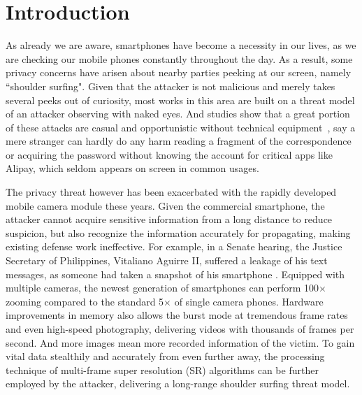 \section{Introduction}
\label{sec-introduction}

As already we are aware, smartphones have become a necessity in our lives, as we are checking our mobile phones constantly throughout the day. As a result, some privacy concerns have arisen about nearby parties peeking at our screen, namely ``shoulder surfing". 
Given that the attacker is not malicious and merely takes several peeks out of curiosity, most works in this area are built on a threat model of an attacker observing with naked eyes. And studies show that a great portion of these attacks are casual and opportunistic without technical equipment~\cite{eiband2017understanding}, say a mere stranger can hardly do any harm reading a fragment of the correspondence or acquiring the password without knowing the account for critical apps like Alipay, which seldom appears on screen in common usages. 

The privacy threat however has been exacerbated with the rapidly developed mobile camera module these years. Given the commercial smartphone, the attacker cannot acquire sensitive information from a long distance to reduce suspicion, but also recognize the information accurately for propagating, making existing defense work ineffective. For example, in a Senate hearing, the Justice Secretary of Philippines, Vitaliano Aguirre II, suffered a leakage of his text messages, as someone had taken a snapshot of his smartphone \cite{Polotiko2017leakage}. Equipped with multiple cameras, the newest generation of smartphones can perform 100$\times$ zooming compared to the standard 5$\times$ of single camera phones. Hardware improvements in memory also allows the burst mode at tremendous frame rates and even high-speed photography, delivering videos with thousands of frames per second. And more images mean more recorded information of the victim. To gain vital data stealthily and accurately from even further away, the processing technique of multi-frame super resolution (SR) algorithms can be further employed by the attacker, delivering a long-range shoulder surfing threat model.

